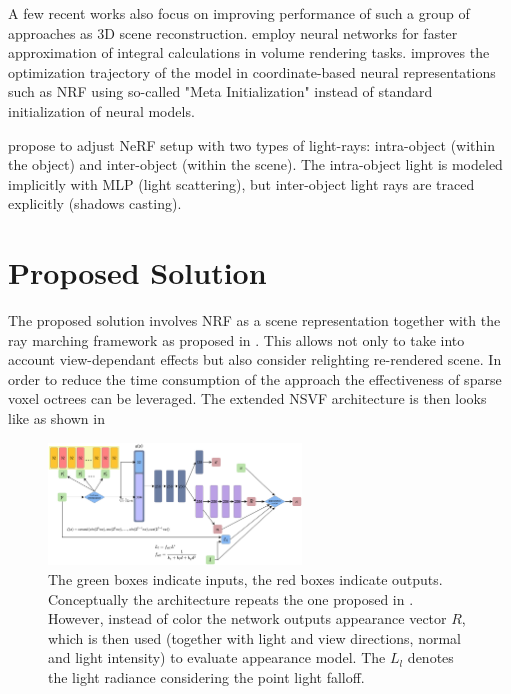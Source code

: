 \documentclass[english]{article}
\begin{document}
A few recent works also focus on improving performance of such a group of approaches as 3D scene reconstruction. \cite{lindell2020autoint} employ neural networks for faster approximation of integral calculations in volume rendering tasks. \cite{tancik2020meta} improves the optimization trajectory of the model in coordinate-based neural representations such as NRF using so-called "Meta Initialization" instead of standard initialization of neural models.

\cite{guo2020osf} propose to adjust NeRF setup with two types of light-rays: intra-object (within the object) and inter-object (within the scene). The intra-object light is modeled implicitly with MLP (light scattering), but inter-object light rays are traced explicitly (shadows casting).



\section{Proposed Solution}

The proposed solution involves NRF as a scene representation together with the ray marching framework as proposed in \cite{nrf2020}. This allows not only to take into account view-dependant effects but also consider relighting re-rendered scene. In order to reduce the time consumption of the approach the effectiveness of sparse voxel octrees \cite{nsvf2020} can be leveraged. The extended NSVF architecture is then looks like as shown in 


\begin{figure}[t]
    \centering
    \includegraphics[width=0.6\textwidth]{img/mlp_nsvfnrf_explicit.png}
    \caption{The green boxes indicate inputs, the red boxes indicate outputs.
    Conceptually the architecture repeats the one proposed in \cite{nsvf2020}. However, instead of color the network outputs appearance vector $R$, which is then used (together with light and view directions, normal and light intensity) to evaluate appearance model. The $L_l$ denotes the light radiance considering the point light falloff.}
    \label{fig:mlp_nsvfnrf_explicit}
\end{figure}
\end{document}

